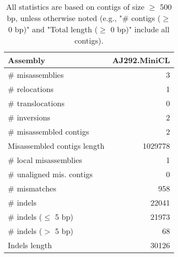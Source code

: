 \documentclass[12pt,a4paper]{article}
\begin{document}
\begin{table}[ht]
\begin{center}
\caption{All statistics are based on contigs of size $\geq$ 500 bp, unless otherwise noted (e.g., "\# contigs ($\geq$ 0 bp)" and "Total length ($\geq$ 0 bp)" include all contigs).}
\begin{tabular}{|l*{1}{|r}|}
\hline
Assembly & AJ292.MiniCL \\ \hline
\# misassemblies & 3 \\ \hline
\hspace{5mm}\# relocations & 1 \\ \hline
\hspace{5mm}\# translocations & 0 \\ \hline
\hspace{5mm}\# inversions & 2 \\ \hline
\# misassembled contigs & 2 \\ \hline
Misassembled contigs length & 1029778 \\ \hline
\# local misassemblies & 1 \\ \hline
\# unaligned mis. contigs & 0 \\ \hline
\# mismatches & 958 \\ \hline
\# indels & 22041 \\ \hline
\hspace{5mm}\# indels ($\leq$ 5 bp) & 21973 \\ \hline
\hspace{5mm}\# indels ($>$ 5 bp) & 68 \\ \hline
Indels length & 30126 \\ \hline
\end{tabular}
\end{center}
\end{table}
\end{document}
